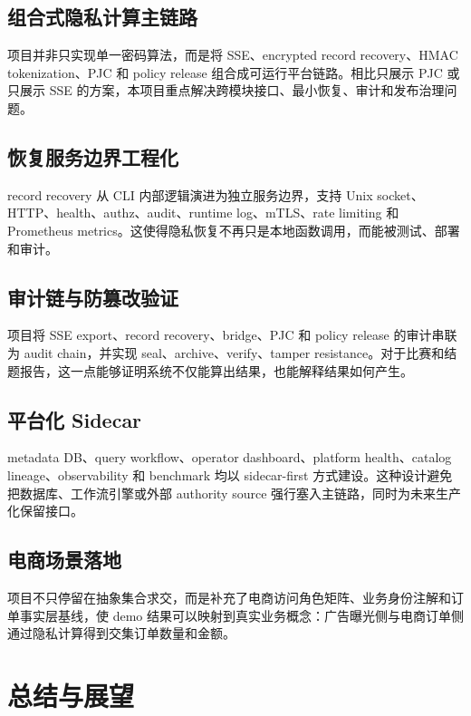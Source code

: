 \documentclass[UTF8,a4paper,12pt,oneside]{ctexrep}
\begin{document}
\section{组合式隐私计算主链路}

项目并非只实现单一密码算法，而是将 SSE、encrypted record recovery、HMAC tokenization、PJC 和 policy release 组合成可运行平台链路。相比只展示 PJC 或只展示 SSE 的方案，本项目重点解决跨模块接口、最小恢复、审计和发布治理问题。

\section{恢复服务边界工程化}

record recovery 从 CLI 内部逻辑演进为独立服务边界，支持 Unix socket、HTTP、health、authz、audit、runtime log、mTLS、rate limiting 和 Prometheus metrics。这使得隐私恢复不再只是本地函数调用，而能被测试、部署和审计。

\section{审计链与防篡改验证}

项目将 SSE export、record recovery、bridge、PJC 和 policy release 的审计串联为 audit chain，并实现 seal、archive、verify、tamper resistance。对于比赛和结题报告，这一点能够证明系统不仅能算出结果，也能解释结果如何产生。

\section{平台化 Sidecar}

metadata DB、query workflow、operator dashboard、platform health、catalog lineage、observability 和 benchmark 均以 sidecar-first 方式建设。这种设计避免把数据库、工作流引擎或外部 authority source 强行塞入主链路，同时为未来生产化保留接口。

\section{电商场景落地}

项目不只停留在抽象集合求交，而是补充了电商访问角色矩阵、业务身份注解和订单事实层基线，使 demo 结果可以映射到真实业务概念：广告曝光侧与电商订单侧通过隐私计算得到交集订单数量和金额。

\chapter{总结与展望}
\end{document}

